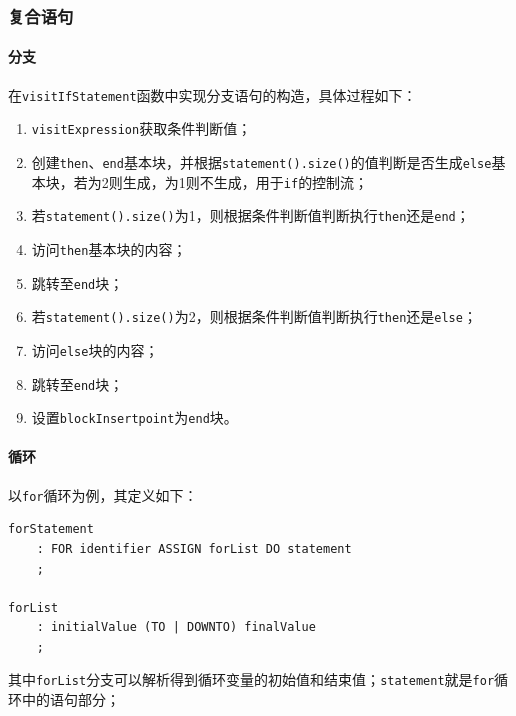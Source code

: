 \documentclass[lang=cn,11pt,a4paper,cite=authornum]{paper}
\begin{document}
\subsubsection{复合语句}

\paragraph{分支} 在\texttt{visitIfStatement}函数中实现分支语句的构造，具体过程如下：

\begin{enumerate}
    \item \texttt{visitExpression}获取条件判断值；
    \item 创建\texttt{then}、\texttt{end}基本块，并根据\texttt{statement().size()}的值判断是否生成\texttt{else}基本块，若为2则生成，为1则不生成，用于\texttt{if}的控制流；
    \item 若\texttt{statement().size()}为1，则根据条件判断值判断执行\texttt{then}还是\texttt{end}；
    \item 访问\texttt{then}基本块的内容；
    \item 跳转至\texttt{end}块；
    \item 若\texttt{statement().size()}为2，则根据条件判断值判断执行\texttt{then}还是\texttt{else}；
    \item 访问\texttt{else}块的内容；
    \item 跳转至\texttt{end}块；
    \item 设置\texttt{blockInsertpoint}为\texttt{end}块。
\end{enumerate}

\paragraph{循环} 以\texttt{for}循环为例，其定义如下：

\begin{code}
    \begin{verbatim}
forStatement
    : FOR identifier ASSIGN forList DO statement
    ;
 
forList
    : initialValue (TO | DOWNTO) finalValue
    ;
\end{verbatim}
\end{code}

其中\texttt{forList}分支可以解析得到循环变量的初始值和结束值；\texttt{statement}就是\texttt{for}循环中的语句部分；
\end{document}
